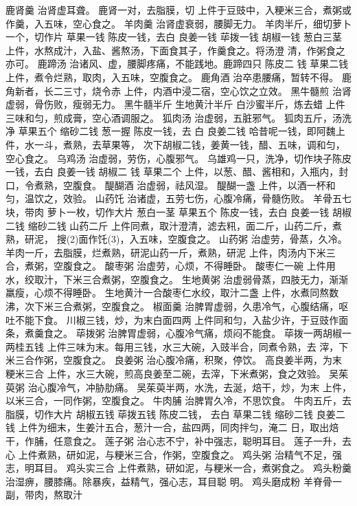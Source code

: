 \documentclass[12pt,UTF8]{ctexbook}
\begin{document}
鹿肾羹 治肾虚耳聋。
鹿肾一对，去脂膜，切
上件于豆豉中，入粳米三合，煮粥或作羹，入五味，空心食之。
羊肉羹 治肾虚衰弱，腰脚无力。
羊肉半斤，细切萝卜一个，切作片 草果一钱 陈皮一钱，去白
良姜一钱 荜拨一钱 胡椒一钱 葱白三茎
上件，水熬成汁，入盐、酱熬汤，下面食其子，作羹食之。将汤澄
清，作粥食之亦可。
鹿蹄汤 治诸风、虚，腰脚疼痛，不能践地。鹿蹄四只 陈皮二
钱 草果二钱
上件，煮令烂熟，取肉，入五味，空腹食之。
鹿角酒 治卒患腰痛，暂转不得。
鹿角新者，长二三寸，烧令赤
上件，内酒中浸二宿，空心饮之立效。
黑牛髓煎 治肾虚弱，骨伤败，瘦弱无力。
黑牛髓半斤 生地黄汁半斤 白沙蜜半斤，炼去蜡
上件三味和匀，煎成膏，空心酒调服之。
狐肉汤 治虚弱，五脏邪气。
狐肉五斤，汤洗净 草果五个 缩砂二钱 葱一握 陈皮一钱，去
白 良姜二钱 哈昔呢一钱，即阿魏上件，水一斗，煮熟，去草果等，
次下胡椒二钱，姜黄一钱，醋、五味，调和匀，空心食之。
乌鸡汤 治虚弱，劳伤，心腹邪气。
乌雄鸡一只，洗净，切作块子陈皮一钱，去白 良姜一钱 胡椒二
钱 草果二个
上件，以葱、醋、酱相和，入瓶内，封口，令煮熟，空腹食。
醍醐酒 治虚弱，祛风湿。
醍醐一盏
上件，以酒一杯和匀，温饮之，效验。
山药饦 治诸虚，五劳七伤，心腹冷痛，骨髓伤败。
羊骨五七块，带肉 萝卜一枚，切作大片 葱白一茎 草果五个
陈皮一钱，去白 良姜一钱 胡椒二钱 缩砂二钱 山药二斤
上件同煮，取汁澄清，滤去籸，面二斤，山药二斤，煮熟，研泥，
搜(2)面作饦(3)，入五味，空腹食之。
山药粥 治虚劳，骨蒸，久冷。
羊肉一斤，去脂膜，烂煮熟，研泥山药一斤，煮熟，研泥
上件，肉汤内下米三合，煮粥，空腹食之。
酸枣粥 治虚劳，心烦，不得睡卧。
酸枣仁一碗
上件用水，绞取汁，下米三合煮粥，空腹食之。
生地黄粥 治虚弱骨蒸，四肢无力，渐渐羸瘦，心烦不得睡卧。
生地黄汁一合酸枣仁水绞，取汁二盏
上件，水煮同熬数沸，次下米三合煮粥，空腹食之。
椒面羹 治脾胃虚弱，久患冷气，心腹结痛，呕吐不能下食。
川椒三钱，炒，为末白面四两
上件同和匀，入盐少许，于豆豉作面条，煮羹食之。
荜拨粥 治脾胃虚弱，心腹冷气痛，烦闷不能食。
荜拨一两胡椒一两桂五钱
上件三味为末。每用三钱，水三大碗，入豉半合，同煮令熟，去
滓，下米三合作粥，空腹食之。
良姜粥 治心腹冷痛，积聚，停饮。
高良姜半两，为末 粳米三合
上件，水三大碗，煎高良姜至二碗，去滓，下米煮粥，食之效验。
吴茱萸粥 治心腹冷气，冲胁肋痛。
吴茱萸半两，水洗，去涎，焙干，炒，为末
上件，以米三合，一同作粥，空腹食之。
牛肉脯 治脾胃久冷，不思饮食。
牛肉五斤，去脂膜，切作大片 胡椒五钱 荜拨五钱 陈皮二钱，
去白 草果二钱 缩砂二钱 良姜二钱
上件为细末，生姜汁五合，葱汁一合，盐四两，同肉拌匀，淹二
日，取出焙干，作脯，任意食之。
莲子粥 治心志不宁，补中强志，聪明耳目。
莲子一升，去心
上件煮熟，研如泥，与粳米三合，作粥，空腹食之。
鸡头粥 治精气不足，强志，明耳目。
鸡头实三合
上件煮熟，研如泥，与粳米一合，煮粥食之。
鸡头粉羹 治湿痹，腰膝痛。除暴疾，益精气，强心志，耳目聪
明。
鸡头磨成粉 羊脊骨一副，带肉，熬取汁
\end{document}
